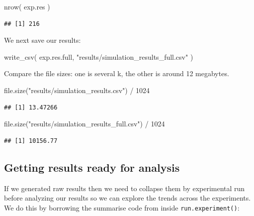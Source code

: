 \documentclass[
]{book}
\newenvironment{Shaded}{\begin{snugshade}}{\end{snugshade}}
\newcommand{\DecValTok}[1]{\textcolor[rgb]{0.00,0.00,0.81}{#1}}
\newcommand{\FunctionTok}[1]{\textcolor[rgb]{0.00,0.00,0.00}{#1}}
\newcommand{\NormalTok}[1]{#1}
\newcommand{\SpecialCharTok}[1]{\textcolor[rgb]{0.00,0.00,0.00}{#1}}
\newcommand{\StringTok}[1]{\textcolor[rgb]{0.31,0.60,0.02}{#1}}
\begin{document}
\begin{Shaded}
\begin{Highlighting}[]
\FunctionTok{nrow}\NormalTok{( exp.res )}
\end{Highlighting}
\end{Shaded}

\begin{verbatim}
## [1] 216
\end{verbatim}

We next save our results:

\begin{Shaded}
\begin{Highlighting}[]
\FunctionTok{write\_csv}\NormalTok{( exp.res.full, }\StringTok{"results/simulation\_results\_full.csv"}\NormalTok{ )}
\end{Highlighting}
\end{Shaded}

Compare the file sizes: one is several k, the other is around 12 megabytes.

\begin{Shaded}
\begin{Highlighting}[]
\FunctionTok{file.size}\NormalTok{(}\StringTok{"results/simulation\_results.csv"}\NormalTok{) }\SpecialCharTok{/} \DecValTok{1024}
\end{Highlighting}
\end{Shaded}

\begin{verbatim}
## [1] 13.47266
\end{verbatim}

\begin{Shaded}
\begin{Highlighting}[]
\FunctionTok{file.size}\NormalTok{(}\StringTok{"results/simulation\_results\_full.csv"}\NormalTok{) }\SpecialCharTok{/} \DecValTok{1024}
\end{Highlighting}
\end{Shaded}

\begin{verbatim}
## [1] 10156.77
\end{verbatim}

\hypertarget{getting-results-ready-for-analysis}{%
\subsection{Getting results ready for analysis}\label{getting-results-ready-for-analysis}}

If we generated raw results then we need to collapse them by experimental run
before analyzing our results so we can explore the trends across the
experiments. We do this by borrowing the summarise code from inside
\texttt{run.experiment()}:
\end{document}
